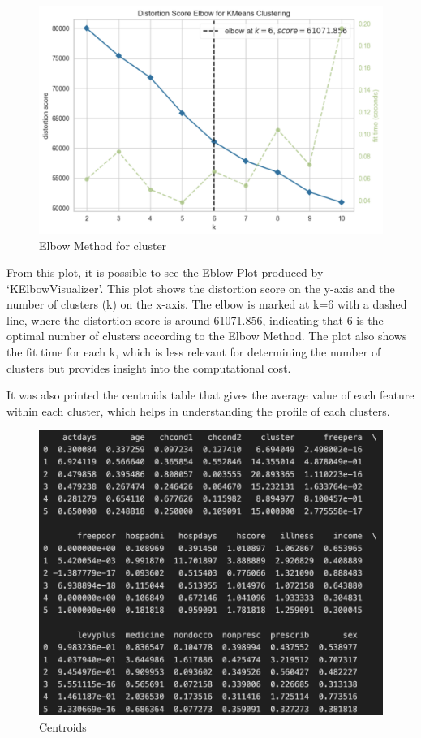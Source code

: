 \documentclass[
]{article}
\begin{document}
\begin{figure}
\centering
\includegraphics{kelbow.png}
\caption{Elbow Method for cluster}
\end{figure}

From this plot, it is possible to see the Eblow Plot produced by
`KElbowVisualizer'. This plot shows the distortion score on the y-axis
and the number of clusters (k) on the x-axis. The elbow is marked at k=6
with a dashed line, where the distortion score is around 61071.856,
indicating that 6 is the optimal number of clusters according to the
Elbow Method. The plot also shows the fit time for each k, which is less
relevant for determining the number of clusters but provides insight
into the computational cost.

It was also printed the centroids table that gives the average value of
each feature within each cluster, which helps in understanding the
profile of each clusters.

\begin{figure}
\centering
\includegraphics{centroids.png}
\caption{Centroids}
\end{figure}
\end{document}
